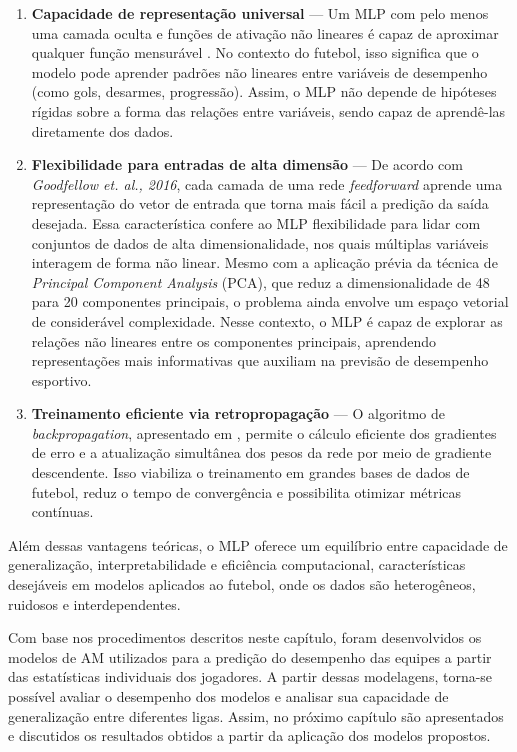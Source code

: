 \begin{enumerate}
    \item \textbf{Capacidade de representação universal} —
    Um MLP com pelo menos uma camada oculta e funções de ativação não lineares é capaz de aproximar qualquer função mensurável \cite{Hornik1991}.
    No contexto do futebol, isso significa que o modelo pode aprender padrões não lineares entre variáveis de desempenho (como gols, desarmes, progressão). 
    Assim, o MLP não depende de hipóteses rígidas sobre a forma das relações entre variáveis, sendo capaz de aprendê-las diretamente dos dados.

    \item \textbf{Flexibilidade para entradas de alta dimensão} —
    De acordo com \textit{Goodfellow et. al., 2016}, cada camada de uma rede \textit{feedforward} aprende uma representação do vetor de entrada que torna 
    mais fácil a predição da saída desejada. 
    Essa característica confere ao MLP flexibilidade para lidar com conjuntos de dados de alta dimensionalidade, nos quais múltiplas variáveis interagem de forma não linear. 
    Mesmo com a aplicação prévia da técnica de \textit{Principal Component Analysis} (PCA), que reduz a dimensionalidade de 48 para 20 componentes principais, 
    o problema ainda envolve um espaço vetorial de considerável complexidade. 
    Nesse contexto, o MLP é capaz de explorar as relações não lineares entre os componentes principais, aprendendo representações 
    mais informativas que auxiliam na previsão de desempenho esportivo.

    \item \textbf{Treinamento eficiente via retropropagação} — 
    O algoritmo de \textit{backpropagation}, apresentado em \cite{Goodfellow2016}, permite o cálculo eficiente dos gradientes de erro e a atualização 
    simultânea dos pesos da rede por meio de gradiente descendente. 
    Isso viabiliza o treinamento em grandes bases de dados de futebol, reduz o tempo de convergência e possibilita otimizar métricas contínuas.
\end{enumerate}

Além dessas vantagens teóricas, o MLP oferece um equilíbrio entre capacidade de generalização, interpretabilidade e eficiência computacional, características 
desejáveis em modelos aplicados ao futebol, onde os dados são heterogêneos, ruidosos e interdependentes.

Com base nos procedimentos descritos neste capítulo, foram desenvolvidos os modelos de AM utilizados para a predição do desempenho das equipes a partir das 
estatísticas individuais dos jogadores. A partir dessas modelagens, torna-se possível avaliar o desempenho dos modelos e analisar sua capacidade de generalização 
entre diferentes ligas. Assim, no próximo capítulo são apresentados e discutidos os resultados obtidos a partir da aplicação dos modelos propostos.